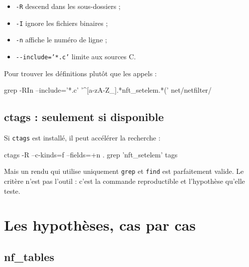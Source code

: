 \documentclass{training}
\begin{document}
\begin{itemize}
  \item \texttt{-R} descend dans les sous-dossiers ;
  \item \texttt{-I} ignore les fichiers binaires ;
  \item \texttt{-n} affiche le numéro de ligne ;
  \item \texttt{-{}-include='*.c'} limite aux sources C.
\end{itemize}

Pour trouver les définitions plutôt que les appels :

\begin{console}
grep -RIn --include='*.c' '^[a-zA-Z_].*nft_setelem.*(' net/netfilter/
\end{console}

\section*{ctags : seulement si disponible}

Si \texttt{ctags} est installé, il peut accélérer la recherche :

\begin{console}
ctags -R --c-kinds=f --fields=+n .
grep 'nft_setelem' tags
\end{console}

Mais un rendu qui utilise uniquement \texttt{grep} et \texttt{find} est
parfaitement valide. Le critère n'est pas l'outil : c'est la commande
reproductible et l'hypothèse qu'elle teste.

\chapter{Les hypothèses, cas par cas}

\section*{nf\_tables}
\end{document}
